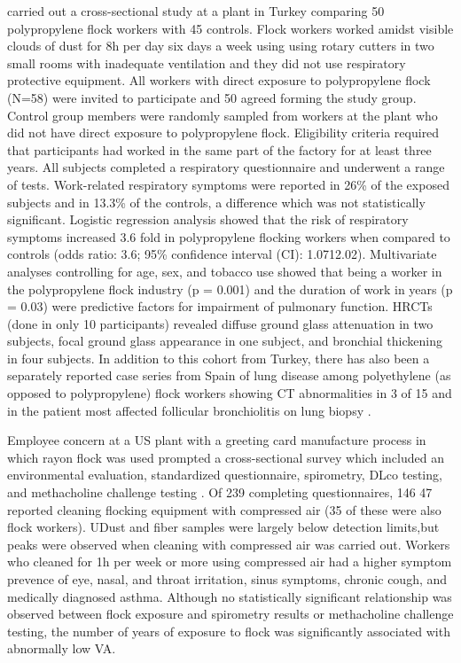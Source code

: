 \documentclass[a4
er,12pt]{article}
\begin{document}
\cite{Atis2005} carried out a cross-sectional study at a plant in Turkey comparing 50 polypropylene flock workers with 45 controls. Flock workers worked amidst visible clouds of dust for 8h per day six days a week using using rotary cutters in two small rooms with inadequate ventilation and they did not use respiratory protective equipment. All workers with direct exposure to polypropylene flock (N=58) were invited to participate and 50 agreed forming the study group. Control group members were randomly sampled from workers at the plant who did not have direct exposure to polypropylene flock. Eligibility criteria required that participants had worked in the same part of the factory for at least three years. All subjects completed a respiratory questionnaire and underwent a range of tests. Work-related respiratory symptoms were reported in 26\% of the exposed subjects and in 13.3\% of the controls, a difference which was not statistically significant. Logistic regression analysis showed that the risk of respiratory symptoms increased 3.6 fold in polypropylene flocking workers when compared to controls (odds ratio: 3.6; 95\% confidence interval (CI): 1.0712.02). Multivariate analyses controlling for age, sex, and tobacco use showed that being a worker in the polypropylene flock industry (p = 0.001) and the duration of work in years (p = 0.03) were predictive factors for impairment of pulmonary function. HRCTs (done in only 10 participants) revealed diffuse ground glass attenuation in two subjects, focal ground glass appearance in one subject, and bronchial thickening in four subjects. In addition to this cohort from Turkey, there has also been a separately reported case series from Spain of lung disease among polyethylene (as opposed to polypropylene) flock workers showing CT abnormalities in 3 of 15 and in the patient most affected follicular bronchiolitis on lung biopsy \cite{Barroso2002}	.

Employee concern at a US plant with a greeting card manufacture process in which rayon flock was used prompted a cross-sectional survey which included an environmental evaluation, standardized questionnaire, spirometry, DLco testing, and methacholine challenge testing \cite{Antao2007}. Of 239 completing questionnaires, 146 47 reported cleaning flocking equipment with compressed air (35 of these were also flock workers). UDust and fiber samples were largely below detection limits,but peaks were observed when cleaning with compressed air was carried out. Workers who cleaned for 1h per week or more using compressed air had a higher symptom prevence of eye, nasal, and throat irritation, sinus symptoms, chronic cough, and medically diagnosed asthma. Although no statistically significant relationship was observed between flock exposure and spirometry results or methacholine challenge testing,  the number of years of exposure to flock was significantly associated with abnormally low VA.
\end{document}
